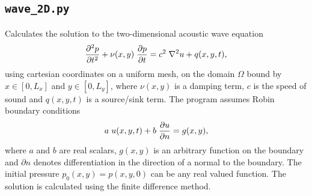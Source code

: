 \documentclass{article}
\begin{document}
\subsection{\texttt{wave\_2D.py}} 
Calculates the solution to the two-dimensional acoustic wave equation
\begin{equation*}
\frac{\partial^2 p}{\partial t^2} + \nu(x,y) \hspace{0.1cm} \frac{\partial p}{\partial t} = c^2 \hspace{0.1cm} \nabla^{2} u + q(x,y,t),
\end{equation*}
using cartesian coordinates on a uniform mesh, on the domain $\Omega$ bound by $x \in [0,L_x]$ and $y \in [0,L_y]$, where $\nu(x,y)$ is a damping term, $c$ is the speed of sound and $q(x,y,t)$ is a source/sink term. The program assumes Robin boundary conditions
\begin{equation*}
a \hspace{0.1cm} u(x,y,t) + b \hspace{0.1cm} \frac{\partial u}{\partial n} = g(x,y),
\end{equation*}
where $a$ and $b$ are real scalars, $g(x,y)$ is an arbitrary function on the boundary and $\partial n$ denotes differentiation in the direction of a normal to the boundary. The initial pressure $p_0(x,y)=p(x,y,0)$ can be any real valued function. The solution is calculated using the finite difference method.
\end{document}
